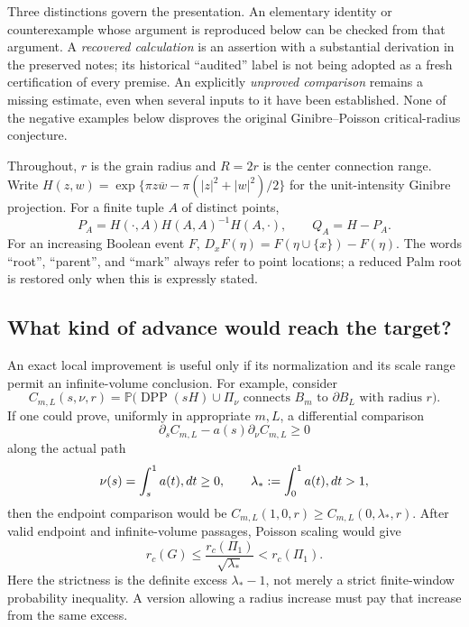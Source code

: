 \documentclass[11pt,a4paper]{article}
\theoremstyle{definition}
\theoremstyle{remark}
\numberwithin{equation}{section}
\begin{document}
Three distinctions govern the presentation.  An elementary identity or
counterexample whose argument is reproduced below can be checked from that
argument.  A \emph{recovered calculation} is an assertion with a substantial
derivation in the preserved notes; its historical ``audited'' label is not
being adopted as a fresh certification of every premise.  An explicitly
\emph{unproved comparison} remains a missing estimate, even when several
inputs to it have been established.  None of the negative examples below
disproves the original Ginibre--Poisson critical-radius conjecture.

Throughout, $r$ is the grain radius and $R=2r$ is the center connection
range.  Write $H(z,w)=\exp\{\pi z\overline w-
\pi(|z|^2+|w|^2)/2\}$ for the unit-intensity Ginibre projection.
For a finite tuple $A$ of distinct points,
\[
 P_A=H(\cdot,A)H(A,A)^{-1}H(A,\cdot),\qquad Q_A=H-P_A.
\]
For an increasing Boolean event $F$, $D_xF(\eta)=F(\eta\cup\{x\})-F(\eta)$.
The words ``root'', ``parent'', and ``mark'' always refer to point
locations; a reduced Palm root is restored only when this is expressly
stated.

\subsection{What kind of advance would reach the target?}
\label{br:sufficient}

An exact local improvement is useful only if its normalization and its
scale range permit an infinite-volume conclusion.  For example, consider
\[
 C_{m,L}(s,\nu,r)=
 \mathbb P\bigl(\operatorname{DPP}(sH)\cup\Pi_\nu
 \text{ connects }B_m\text{ to }\partial B_L
 \text{ with radius }r\bigr).
\]
If one could prove, uniformly in appropriate $m,L$, a differential
comparison
\begin{equation}
 \partial_s C_{m,L}-a(s)\partial_\nu C_{m,L}\geq 0
 \label{br:characteristic}
\end{equation}
along the actual path
\[
 \nu(s)=\int_s^1 a(t)\\,dt\geq0,
 \qquad \lambda_*:=\int_0^1 a(t)\\,dt>1,
\]
then the endpoint comparison would be
$C_{m,L}(1,0,r)\geq C_{m,L}(0,\lambda_*,r)$.
After valid endpoint and infinite-volume passages, Poisson scaling would
give
\[
 r_c(G)\leq \frac{r_c(\Pi_1)}{\sqrt{\lambda_*}}
 <r_c(\Pi_1).
\]
Here the strictness is the definite excess $\lambda_*-1$, not merely a
strict finite-window probability inequality.  A version allowing a
radius increase must pay that increase from the same excess.
\end{document}

